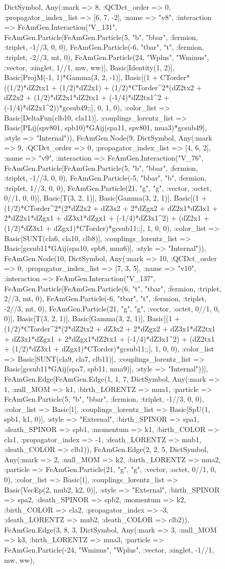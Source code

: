 \documentclass{revtex4}
\begin{document}
\begin{figure}[!htb]
\begin{center}
{Dict{Symbol, Any}(:mark => 8, :QCDct_order => 0, :propagator_index_list => [6, 7, -2], :name => "v8", :interaction => FeAmGen.Interaction("V_131", FeAmGen.Particle[FeAmGen.Particle(5, "b", "bbar", :fermion, :triplet, -1//3, 0, 0), FeAmGen.Particle(-6, "tbar", "t", :fermion, :triplet, -2//3, mt, 0), FeAmGen.Particle(24, "Wplus", "Wminus", :vector, :singlet, 1//1, mw, ww)], Basic[Identity(1, 2)], Basic[ProjM(-1, 1)*Gamma(3, 2, -1)], Basic[(1 + CTorder*((1/2)*dZ2tx1 + (1/2)*dZ2x1) + (1/2)*CTorder^2*(dZ2tx2 + dZ2x2 + (1/2)*dZ2x1*dZ2tx1 + (-1/4)*dZ2tx1^2 + (-1/4)*dZ2x1^2))*gcsub49;;], 0, 1, 0), :color_list => Basic[DeltaFun(clb10, cla11)], :couplings_lorentz_list => Basic[PLij(spv801, spb10)*GAij(spa11, spv801, mua3)*gcsub49], :style => "Internal")), FeAmGen.Node(9, Dict{Symbol, Any}(:mark => 9, :QCDct_order => 0, :propagator_index_list => [4, 6, 2], :name => "v9", :interaction => FeAmGen.Interaction("V_76", FeAmGen.Particle[FeAmGen.Particle(5, "b", "bbar", :fermion, :triplet, -1//3, 0, 0), FeAmGen.Particle(-5, "bbar", "b", :fermion, :triplet, 1//3, 0, 0), FeAmGen.Particle(21, "g", "g", :vector, :octet, 0//1, 0, 0)], Basic[T(3, 2, 1)], Basic[Gamma(3, 2, 1)], Basic[(1 + (1/2)*CTorder^2*(2*dZ2x2 + dZ3x2 + 2*dZgx2 + dZ2x1*dZ3x1 + 2*dZ2x1*dZgx1 + dZ3x1*dZgx1 + (-1/4)*dZ3x1^2) + (dZ2x1 + (1/2)*dZ3x1 + dZgx1)*CTorder)*gcsub11;;], 1, 0, 0), :color_list => Basic[SUNT(cla6, cla10, clb8)], :couplings_lorentz_list => Basic[gcsub11*GAij(spa10, spb8, mua6)], :style => "Internal")), FeAmGen.Node(10, Dict{Symbol, Any}(:mark => 10, :QCDct_order => 0, :propagator_index_list => [7, 3, 5], :name => "v10", :interaction => FeAmGen.Interaction("V_137", FeAmGen.Particle[FeAmGen.Particle(6, "t", "tbar", :fermion, :triplet, 2//3, mt, 0), FeAmGen.Particle(-6, "tbar", "t", :fermion, :triplet, -2//3, mt, 0), FeAmGen.Particle(21, "g", "g", :vector, :octet, 0//1, 0, 0)], Basic[T(3, 2, 1)], Basic[Gamma(3, 2, 1)], Basic[(1 + (1/2)*CTorder^2*(2*dZ2tx2 + dZ3x2 + 2*dZgx2 + dZ3x1*dZ2tx1 + dZ3x1*dZgx1 + 2*dZgx1*dZ2tx1 + (-1/4)*dZ3x1^2) + (dZ2tx1 + (1/2)*dZ3x1 + dZgx1)*CTorder)*gcsub11;;], 1, 0, 0), :color_list => Basic[SUNT(cla9, cla7, clb11)], :couplings_lorentz_list => Basic[gcsub11*GAij(spa7, spb11, mua9)], :style => "Internal"))], FeAmGen.Edge[FeAmGen.Edge(1, 1, 7, Dict{Symbol, Any}(:mark => 1, :null_MOM => k1, :birth_LORENTZ => mua1, :particle => FeAmGen.Particle(5, "b", "bbar", :fermion, :triplet, -1//3, 0, 0), :color_list => Basic[1], :couplings_lorentz_list => Basic[SpU(1, spb1, k1, 0)], :style => "External", :birth_SPINOR => spa1, :death_SPINOR => spb1, :momentum => k1, :birth_COLOR => cla1, :propagator_index => -1, :death_LORENTZ => mub1, :death_COLOR => clb1)), FeAmGen.Edge(2, 2, 5, Dict{Symbol, Any}(:mark => 2, :null_MOM => k2, :birth_LORENTZ => mua2, :particle => FeAmGen.Particle(21, "g", "g", :vector, :octet, 0//1, 0, 0), :color_list => Basic[1], :couplings_lorentz_list => Basic[VecEp(2, mub2, k2, 0)], :style => "External", :birth_SPINOR => spa2, :death_SPINOR => spb2, :momentum => k2, :birth_COLOR => cla2, :propagator_index => -3, :death_LORENTZ => mub2, :death_COLOR => clb2)), FeAmGen.Edge(3, 8, 3, Dict{Symbol, Any}(:mark => 3, :null_MOM => k3, :birth_LORENTZ => mua3, :particle => FeAmGen.Particle(-24, "Wminus", "Wplus", :vector, :singlet, -1//1, mw, ww), }
\end{center}
\end{figure}
\end{document}
